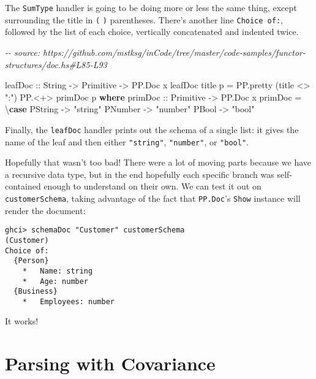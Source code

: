 \documentclass[]{article}
\newenvironment{Shaded}{}{}
\newcommand{\CommentTok}[1]{\textcolor[rgb]{0.38,0.63,0.69}{\textit{#1}}}
\newcommand{\DataTypeTok}[1]{\textcolor[rgb]{0.56,0.13,0.00}{#1}}
\newcommand{\KeywordTok}[1]{\textcolor[rgb]{0.00,0.44,0.13}{\textbf{#1}}}
\newcommand{\NormalTok}[1]{#1}
\newcommand{\OperatorTok}[1]{\textcolor[rgb]{0.40,0.40,0.40}{#1}}
\newcommand{\OtherTok}[1]{\textcolor[rgb]{0.00,0.44,0.13}{#1}}
\newcommand{\StringTok}[1]{\textcolor[rgb]{0.25,0.44,0.63}{#1}}
\begin{document}
The \texttt{SumType} handler is going to be doing more or less the same thing,
except surrounding the title in \texttt{(} \texttt{)} parentheses. There's
another line \texttt{Choice\ of:}, followed by the list of each choice,
vertically concatenated and indented twice.

\begin{Shaded}
\begin{Highlighting}[]
\CommentTok{{-}{-} source: https://github.com/mstksg/inCode/tree/master/code{-}samples/functor{-}structures/doc.hs\#L85{-}L93}

\OtherTok{leafDoc ::} \DataTypeTok{String} \OtherTok{{-}>} \DataTypeTok{Primitive} \OtherTok{{-}>} \DataTypeTok{PP.Doc}\NormalTok{ x}
\NormalTok{leafDoc title p }\OtherTok{=}\NormalTok{ PP.pretty (title }\OperatorTok{<>} \StringTok{":"}\NormalTok{)}
           \OperatorTok{PP.<+>}\NormalTok{ primDoc p}
  \KeywordTok{where}
\OtherTok{    primDoc ::} \DataTypeTok{Primitive} \OtherTok{{-}>} \DataTypeTok{PP.Doc}\NormalTok{ x}
\NormalTok{    primDoc }\OtherTok{=}\NormalTok{ \textbackslash{}}\KeywordTok{case}
      \DataTypeTok{PString} \OtherTok{{-}>} \StringTok{"string"}
      \DataTypeTok{PNumber} \OtherTok{{-}>} \StringTok{"number"}
      \DataTypeTok{PBool}   \OtherTok{{-}>} \StringTok{"bool"}
\end{Highlighting}
\end{Shaded}

Finally, the \texttt{leafDoc} handler prints out the schema of a single list: it
gives the name of the leaf and then either \texttt{"string"}, \texttt{"number"},
or \texttt{"bool"}.

Hopefully that wasn't too bad! There were a lot of moving parts because we have
a recursive data type, but in the end hopefully each specific branch was
self-contained enough to understand on their own. We can test it out on
\texttt{customerSchema}, taking advantage of the fact that \texttt{PP.Doc}'s
\texttt{Show} instance will render the document:

\begin{verbatim}
ghci> schemaDoc "Customer" customerSchema
(Customer)
Choice of:
  {Person}
    *   Name: string
    *   Age: number
  {Business}
    *   Employees: number
\end{verbatim}

It works!

\hypertarget{parsing-with-covariance}{%
\section{Parsing with Covariance}\label{parsing-with-covariance}}
\end{document}
